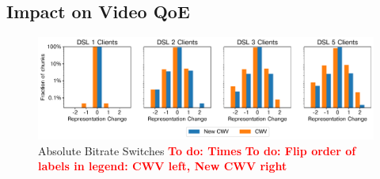 \documentclass[10pt,sigconf,anonymous]{acmart}
\newcommand{\todo}[1]{\textbf{\textcolor{red}{To do: #1}}}
\begin{document}



\subsection{Impact on Video QoE}
\label{sec:QoE-impact}

\begin{figure}
  \centering
  \includegraphics[width=\textwidth, keepaspectratio]{figures/bitrate_derivative_distribution.pdf}
  \caption{Absolute Bitrate Switches \todo{Times} \todo{Flip order of labels in legend: CWV left, New CWV right}}
  \label{fig:bitrate-switches}
\end{figure}
\end{document}
